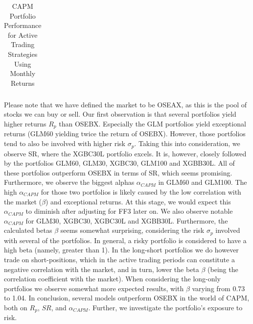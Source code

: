 \begin{table}[H]
\begin{tabularx}{\textwidth}{Xllllllll}
\bottomrule
\end{tabularx}
\vspace{1em}
\caption{{CAPM Portfolio Performance for Active Trading Strategies Using Monthly Returns}}
\label{tab:new-performance-trading-return-sigma-sharpe-alpha-beta-te-ir}
\end{table}

Please note that we have defined the market to be OSEAX, as this is the pool of stocks we can buy or sell. Our first observation is that several portfolios yield higher returns $R_p$ than OSEBX. Especially the GLM portfolios yield exceptional returns (GLM60 yielding twice the return of OSEBX). However, those portfolios tend to also be involved with higher risk $\sigma_p$. Taking this into consideration, we observe SR, where the XGBC30L portfolio excels. It is, however, closely followed by the portfolios GLM60, GLM30, XGBC30, GLM100 and XGBB30L. All of these portfolios outperform OSEBX in terms of SR, which seems promising. Furthermore, we observe the biggest alphas $\alpha_{CAPM}$ in GLM60 and GLM100. The high $\alpha_{CAPM}$ for those two portfolios is likely caused by the low correlation with the market ($\beta$) and exceptional returns. At this stage, we would expect this $\alpha_{CAPM}$ to diminish after adjusting for FF3 later on. We also observe notable $\alpha_{CAPM}$ for GLM30, XGBC30, XGBC30L and XGBB30L. Furthermore, the calculated betas $\beta$ seems somewhat surprising, considering the risk $\sigma_p$ involved with several of the portfolios. In general, a risky portfolio is considered to have a high beta (namely, greater than 1). In the long-short portfolios we do however trade on short-positions, which in the active trading periods can constitute a negative correlation with the market, and in turn, lower the beta $\beta$ (being the correlation coefficient with the market). When considering the long-only portfolios we observe somewhat more expected results, with $\beta$ varying from 0.73 to 1.04. In conclusion, several models outperform OSEBX in the world of CAPM, both on $R_p$, $SR$, and $\alpha_{CAPM}$. Further, we investigate the portfolio's exposure to risk.

